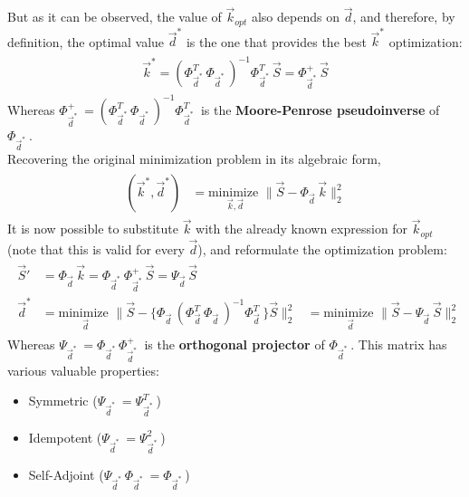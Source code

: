 \documentclass[11pt]{scrartcl} %
\begin{document}
But as it can be observed, the value of \(\vec{k}_{opt}\) also depends on \(\vec{d}\), and therefore, by definition, the optimal value \(\vec{d}^*\) is the one that provides the best \(\vec{k}^*\) optimization:
\begin{align*}
    \begin{aligned}
      \vec{k}^* =  (\Phi_{\vec{d}^*\;}^T \Phi_{\vec{d}^*\;})^{-1} \Phi_{\vec{d}^*\;}^T\vec{S} = \Phi_{\vec{d}^*\;}^+ \vec{S}
    \end{aligned}
\end{align*}
Whereas \(\Phi_{\vec{d}^*\;}^+ = (\Phi_{\vec{d}^*\;}^T \Phi_{\vec{d}^*\;})^{-1} \Phi_{\vec{d}^*\;}^T\) is the \textbf{Moore-Penrose pseudoinverse} of \(\Phi_{\vec{d}^*\;}\).\\
Recovering the original minimization problem in its algebraic form,
\begin{align*}
  \begin{aligned}
    (\vec{k}^*, \vec{d}^*) &= \underset{\vec{k}, \vec{d}}{\text{minimize }}
    \bigg\lVert \vec{S}-\Phi_{\vec{d}\;} \vec{k}\bigg\rVert_2^2
    \end{aligned}
\end{align*}
It is now possible to substitute \(\vec{k}\) with the already known expression for \(\vec{k}_{opt}\) (note that this is valid for every \(\vec{d}\)), and reformulate the optimization problem:
\begin{align*}
  \begin{aligned}
    \vec{S}'  &= \Phi_{\vec{d}\;} \vec{k}= \Phi_{\vec{d}^*\;} \Phi_{\vec{d}^*\;}^+ \vec{S} = \Psi_{\vec{d}\;} \vec{S} \\[10pt]
    \vec{d}^* &= \underset{\vec{d}}{\text{minimize }}
    \bigg\lVert \vec{S}-\Big\{\Phi_{\vec{d}\;} (\Phi_{\vec{d}\;}^T \Phi_{\vec{d}\;})^{-1} \Phi_{\vec{d}\;}^T\Big\}\vec{S} \bigg\rVert_2^2 &= \underset{\vec{d}}{\text{minimize }}
    \bigg\lVert \vec{S}- \Psi_{\vec{d}\;} \vec{S} \bigg\rVert_2^2
    \end{aligned}
\end{align*}
Whereas \(\Psi_{\vec{d}^*\;} =  \Phi_{\vec{d}^*\;} \Phi_{\vec{d}^*\;}^+\) is the \textbf{orthogonal projector} of \(\Phi_{\vec{d}^*\;}\). This matrix has various valuable properties:
\begin{itemize}
\item Symmetric (\(\Psi_{\vec{d}^*\;} = \Psi_{\vec{d}^*\;}^T\))
\item Idempotent (\(\Psi_{\vec{d}^*\;} = \Psi_{\vec{d}^*\;}^2\))
\item Self-Adjoint (\(\Psi_{\vec{d}^*\;}\Phi_{\vec{d}^*\;} = \Phi_{\vec{d}^*\;}\))
\end{itemize}
\end{document}
